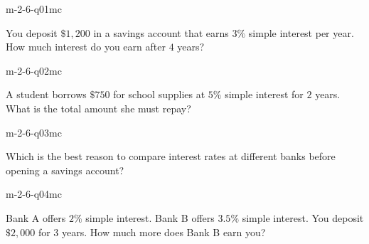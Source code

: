 

\begin{practiceQuestion}{m-2-6-q01}{mc}
\begin{questionText}
You deposit $\$1{,}200$ in a savings account that earns $3\%$ simple interest per year. How much interest do you earn after $4$ years?
\end{questionText}
\end{practiceQuestion}

\begin{practiceQuestion}{m-2-6-q02}{mc}
\begin{questionText}
A student borrows $\$750$ for school supplies at $5\%$ simple interest for $2$ years. What is the total amount she must repay?
\end{questionText}
\end{practiceQuestion}

\begin{practiceQuestion}{m-2-6-q03}{mc}
\begin{questionText}
Which is the best reason to compare interest rates at different banks before opening a savings account?
\end{questionText}
\end{practiceQuestion}

\begin{practiceQuestion}{m-2-6-q04}{mc}
\begin{questionText}
Bank A offers $2\%$ simple interest. Bank B offers $3.5\%$ simple interest. You deposit $\$2{,}000$ for $3$ years. How much more does Bank B earn you?
\end{questionText}
\end{practiceQuestion}

